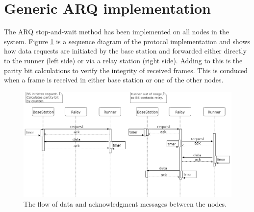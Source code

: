 \section{Generic ARQ implementation}\label{sc:overall}

The ARQ stop-and-wait method has been implemented on all nodes in the system. Figure \ref{fig:tohopornotarqsequence} is a sequence diagram of the  protocol implementation and shows how data requests are initiated by the base station and forwarded either directly to the runner (left side) or via a relay station (right side). Adding to this is the parity bit calculations to verify the integrity of received frames. This is conduced when a frame is received in either base station or one of the other nodes.

\begin{figure}[H]
	\centering
	\includegraphics[width=1\linewidth]{implementation/overall/toHopOrNotArqSequence}
	\caption{The flow of data and acknowledgment messages between the nodes.}
	\label{fig:tohopornotarqsequence}
\end{figure}

